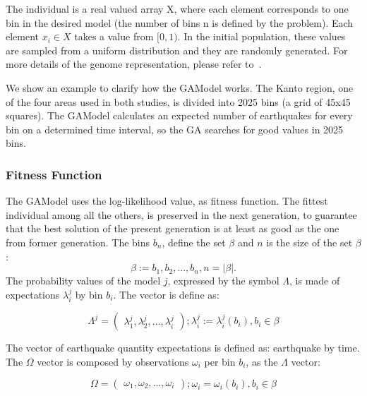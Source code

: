 The individual is a real valued array X, where each element corresponds to one bin in the desired model (the number of bins n is defined by the problem). Each element $x_i \in X$ takes a value from $[0,1)$. In the initial population, these values are sampled from a uniform distribution and they are randomly generated. For more details of the genome representation, please refer to~\cite{ecta14}.

We show an example to clarify how the GAModel works. The Kanto region, one of the four areas used in both studies, is divided into 2025 bins (a grid of 45x45 squares). The GAModel calculates an expected number of earthquakes for every bin on a determined time interval, so the GA searches for good values in 2025 bins.
\subsubsection{Fitness Function}\label{fitGA}

The GAModel uses the log-likelihood value, as fitness
function. The fittest individual among all the others, is preserved in the next generation, to guarantee that the best solution of the present generation is at least as good as the one from former generation.  The bins $b_n$, define the set $\beta$ and $n$ is the size of the set $\beta$:
\begin{equation} 
\beta := {b_1,b_2,...,b_n},n = |\beta|.
\end{equation}
The probability values of the model $j$, expressed by the symbol
$\Lambda$, is made of expectations $\lambda_i^j$ by bin $b_i$. The
vector is define as:

\begin{equation}
\Lambda^j = 
\begin{pmatrix}
\lambda_1^j, 
\lambda_2^j, 
\hdots,
\lambda_i^j
\end{pmatrix}
;\lambda_i^j := \lambda_i^j(b_i),b_i \in \beta
\end{equation}

The vector of earthquake quantity expectations is defined as:
earthquake by time. The $\Omega$ vector is composed by observations
$\omega_i$ per bin $b_i$, as the $\Lambda$ vector:

\begin{equation}
\Omega = 
\begin{pmatrix}
\omega_1,
\omega_2,
\hdots,
\omega_i
\end{pmatrix}
;\omega_i =\omega_i(b_i),b_i \in \beta
\end{equation}

